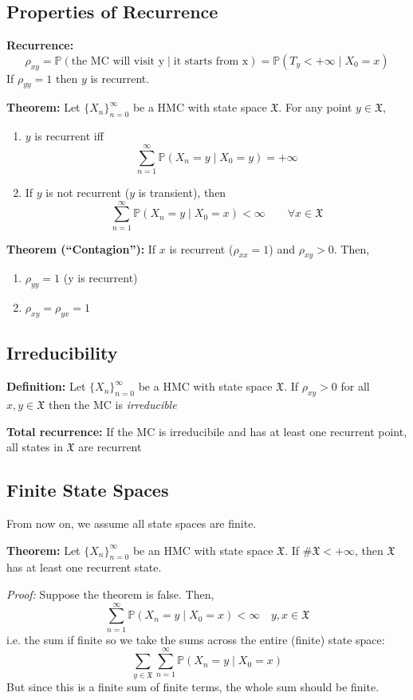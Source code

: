 \documentclass[12pt]{article}
\renewcommand{\P}{\mathbb{P}}
\newcommand{\mfX}{\mathfrak{X}}
\begin{document}
\subsection{Properties of Recurrence}
\textbf{Recurrence:} 
\[\rho_{xy} = \P(\text{the MC will visit y} \; | \; \text{it starts from x}) = \P(T_y < +\infty \; | \; X_0 = x)\] 
If $\rho_{yy} = 1$ then $y$ is recurrent. 

\textbf{Theorem:} Let $\{X_n\}_{n=0}^\infty$ be a HMC with state space $\mfX$. For any point $y \in \mfX$, 
\begin{enumerate}
    \item $y$ is recurrent iff 
        \[\sum_{n=1}^\infty \P(X_n = y \; | \; X_0 = y) = +\infty \]

    \item If $y$ is not recurrent ($y$ is transient), then 
        \[\sum_{n=1}^\infty \P(X_n = y \; | \; X_0 = x) < \infty \qquad \forall x \in \mfX\]
\end{enumerate}

\textbf{Theorem (``Contagion''):} If $x$ is recurrent ($\rho_{xx} = 1$) and $\rho_{xy} > 0$. Then, 
\begin{enumerate}
    \item $\rho_{yy} = 1$ (y is recurrent)
    \item $\rho_{xy} = \rho_{yx} = 1$
\end{enumerate}

\subsection{Irreducibility}
\textbf{Definition:} Let $\{X_n\}_{n=0}^\infty$ be a HMC with state space $\mfX$. If $\rho_{xy} > 0$ for all $x, y \in \mfX$ then the MC is \emph{irreducible}

\textbf{Total recurrence:} If the MC is irreducibile and has at least one recurrent point, all states in $\mfX$ are recurrent 

\subsection{Finite State Spaces}
From now on, we assume all state spaces are finite.

\textbf{Theorem:} Let $\{X_n\}_{n=0}^\infty$ be an HMC with state space $\mfX$. If $\#\mfX < +\infty$, then $\mfX$ has at least one recurrent state. 

\emph{Proof:} Suppose the theorem is false. Then, 
\[\sum_{n=1}^\infty \P(X_n = y \; | \; X_0 = x) < \infty \quad y, x \in \mfX\]
i.e. the sum if finite so we take the sums across the entire (finite) state space:
\[\sum_{y \in \mfX} \sum_{n=1}^\infty \P(X_n = y \; | \; X_0 = x)\]
But since this is a finite sum of finite terms, the whole sum should be finite. 
\end{document}
